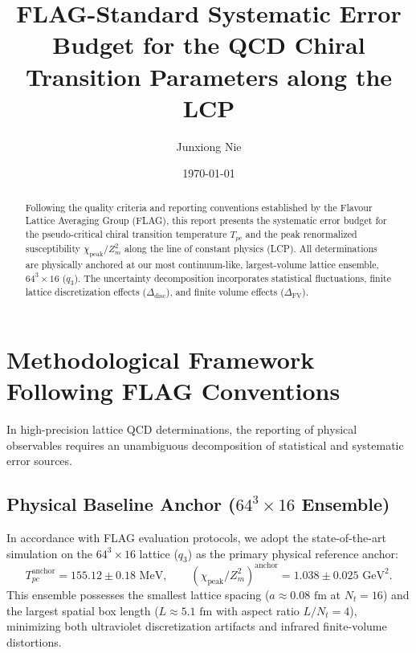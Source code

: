 \documentclass[11pt,a4paper]{article}
\title{\textbf{FLAG-Standard Systematic Error Budget for the QCD Chiral Transition Parameters along the LCP}}
\author{Junxiong Nie}
\date{\today}
\begin{document}
\maketitle

\begin{abstract}
Following the quality criteria and reporting conventions established by the Flavour Lattice Averaging Group (FLAG), this report presents the systematic error budget for the pseudo-critical chiral transition temperature $T_{pc}$ and the peak renormalized susceptibility $\chi_{\mathrm{peak}}/Z_m^2$ along the line of constant physics (LCP). All determinations are physically anchored at our most continuum-like, largest-volume lattice ensemble, $64^3 \times 16$ ($q_3$). The uncertainty decomposition incorporates statistical fluctuations, finite lattice discretization effects ($\Delta_{\mathrm{disc}}$), and finite volume effects ($\Delta_{\mathrm{FV}}$).
\end{abstract}

\section{Methodological Framework Following FLAG Conventions}

In high-precision lattice QCD determinations, the reporting of physical observables requires an unambiguous decomposition of statistical and systematic error sources.

\subsection{Physical Baseline Anchor ($64^3 \times 16$ Ensemble)}
In accordance with FLAG evaluation protocols, we adopt the state-of-the-art simulation on the $64^3 \times 16$ lattice ($q_3$) as the primary physical reference anchor:
\begin{equation}
    T_{pc}^{\mathrm{anchor}} = 155.12 \pm 0.18\text{ MeV}, \qquad
    \left(\chi_{\mathrm{peak}}/Z_m^2\right)^{\mathrm{anchor}} = 1.038 \pm 0.025\text{ GeV}^2.
\end{equation}
This ensemble possesses the smallest lattice spacing ($a \approx 0.08\text{ fm}$ at $N_t=16$) and the largest spatial box length ($L \approx 5.1\text{ fm}$ with aspect ratio $L/N_t = 4$), minimizing both ultraviolet discretization artifacts and infrared finite-volume distortions.
\end{document}
